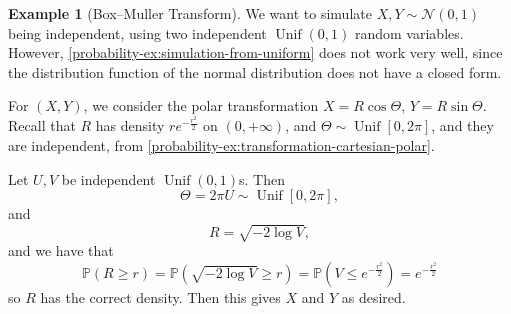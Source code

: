 \documentclass[11pt]{article}
\numberwithin{equation}{section}
\theoremstyle{definition}
\newtheorem{example}[theorem]{Example}
\theoremstyle{remark}
\newcommand{\pqty}[1]{\left(#1\right)}
\newcommand{\flatfrac}[2]{\frac{#1}{#2}}
\newcommand{\ccintv}[2]{[#1,#2]}
\newcommand{\oointv}[2]{(#1,#2)}
\newcommand{\plusinfty}{+\infty}
\newcommand{\Prob}{\mathbb P}
\newcommand{\Uniform}{\operatorname{Unif}}
\newcommand{\Normal}{\mathcal N}
\begin{document}
\begin{example}[Box--Muller Transform]\label{probability-example-047}
    \label{probability-ex:box-muller}%
    We want to simulate \(X, Y \sim \Normal\pqty{0, 1}\) being independent, using two independent \(\Uniform\oointv{0}{1}\) random variables. However, \autoref{probability-ex:simulation-from-uniform} does not work very well, since the distribution function of the normal distribution does not have a closed form.

    For \(\pqty{X, Y}\), we consider the polar transformation \(X = R \cos \Theta\), \(Y = R \sin \Theta\). Recall that \(R\) has density \(r e^{- \flatfrac{r^2}{2}}\) on \(\oointv{0}{\plusinfty}\), and \(\Theta \sim \Uniform \ccintv{0}{2\pi}\), and they are independent, from \autoref{probability-ex:transformation-cartesian-polar}.

    Let \(U, V\) be independent \(\Uniform\oointv{0}{1}\)s. Then
    \[
        \Theta = 2 \pi U \sim \Uniform \ccintv{0}{2\pi},
    \]
    and
    \[
        R = \sqrt{- 2 \log V},
    \]
    and we have that
    \[
        \Prob\pqty{R \geq r} = \Prob\pqty{\sqrt{- 2 \log V} \geq r} = \Prob\pqty{V \leq e^{- \flatfrac{r^2}{2}}} = e^{- \flatfrac{r^2}{2}}
    \]
    so \(R\) has the correct density. Then this gives \(X\) and \(Y\) as desired.
\end{example}
\end{document}
